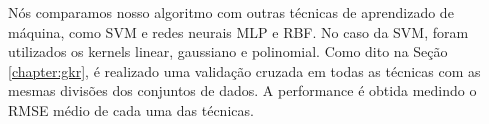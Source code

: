 Nós comparamos nosso algoritmo com outras técnicas de aprendizado de máquina, como SVM e redes neurais MLP e RBF. No caso da SVM, foram utilizados os kernels linear, gaussiano e polinomial. Como dito na Seção \ref{chapter:gkr}, é realizado uma validação cruzada em todas as técnicas com as mesmas divisões dos conjuntos de dados. A performance é obtida medindo o RMSE médio de cada uma das técnicas.

